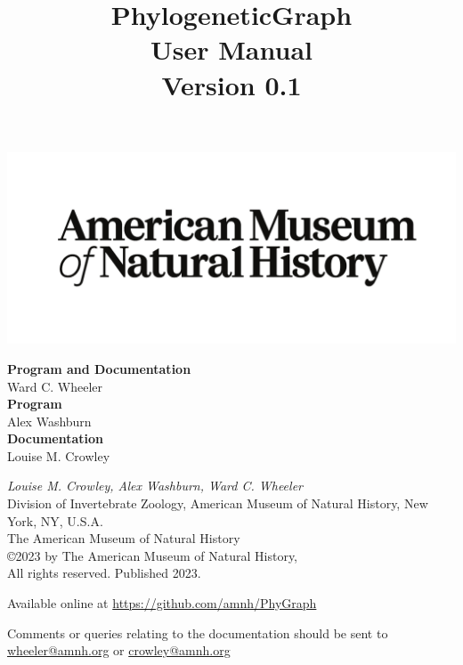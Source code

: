 \documentclass[11pt]{book}
\begin{document}
	
	\title{PhylogeneticGraph\\User Manual\\Version 0.1}
	
	\maketitle
	
	\newpage

	 \begin{center}
		\includegraphics[width=\textwidth]{AMNHLogo.pdf}
	\end{center}

	\vspace*{2.50cm}	
	\begin{flushleft}
		\textbf {Program and Documentation} \\ Ward C. Wheeler \\
		\vspace*{0.50cm}
		\textbf {Program} \\ Alex Washburn \\
		\vspace*{0.50cm}
		\textbf{Documentation} \\ Louise M. Crowley
	\end{flushleft}
	

	\vspace*{2.50cm}
	
	\begin{flushleft}
		\small
		{\it Louise M. Crowley, Alex Washburn, Ward C. Wheeler} \\
		
		Division of Invertebrate Zoology, American Museum of Natural History, New York, NY, U.S.A.\\
		\smallskip
		The American Museum of Natural History\\
		\copyright 2023 by The American Museum of Natural History, \\
		All rights reserved. Published 2023.
		
		\vspace*{0.25cm}
		
		Available online at \url{https://github.com/amnh/PhyGraph}
		
		Comments or queries relating to the documentation should be sent to \href{mailto:wheeler@amnh.org}
		{wheeler@amnh.org} or \href{mailto:crowley@amnh.org}{crowley@amnh.org}
	\end{flushleft}
	
\end{document}
